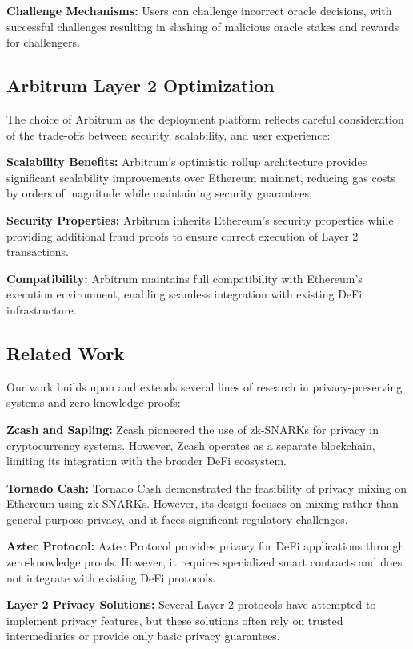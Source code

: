 \documentclass[11pt,a4paper]{article}
\begin{document}
\textbf{Challenge Mechanisms:} Users can challenge incorrect oracle decisions, with successful challenges resulting in slashing of malicious oracle stakes and rewards for challengers.

\subsection{Arbitrum Layer 2 Optimization}

The choice of Arbitrum as the deployment platform reflects careful consideration of the trade-offs between security, scalability, and user experience:

\textbf{Scalability Benefits:} Arbitrum's optimistic rollup architecture provides significant scalability improvements over Ethereum mainnet, reducing gas costs by orders of magnitude while maintaining security guarantees.

\textbf{Security Properties:} Arbitrum inherits Ethereum's security properties while providing additional fraud proofs to ensure correct execution of Layer 2 transactions.

\textbf{Compatibility:} Arbitrum maintains full compatibility with Ethereum's execution environment, enabling seamless integration with existing DeFi infrastructure.

\subsection{Related Work}

Our work builds upon and extends several lines of research in privacy-preserving systems and zero-knowledge proofs:

\textbf{Zcash and Sapling:} Zcash pioneered the use of zk-SNARKs for privacy in cryptocurrency systems. However, Zcash operates as a separate blockchain, limiting its integration with the broader DeFi ecosystem.

\textbf{Tornado Cash:} Tornado Cash demonstrated the feasibility of privacy mixing on Ethereum using zk-SNARKs. However, its design focuses on mixing rather than general-purpose privacy, and it faces significant regulatory challenges.

\textbf{Aztec Protocol:} Aztec Protocol provides privacy for DeFi applications through zero-knowledge proofs. However, it requires specialized smart contracts and does not integrate with existing DeFi protocols.

\textbf{Layer 2 Privacy Solutions:} Several Layer 2 protocols have attempted to implement privacy features, but these solutions often rely on trusted intermediaries or provide only basic privacy guarantees.
\end{document}
